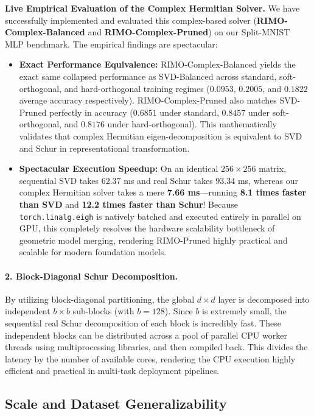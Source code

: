 \textbf{Live Empirical Evaluation of the Complex Hermitian Solver.}
We have successfully implemented and evaluated this complex-based solver (\textbf{RIMO-Complex-Balanced} and \textbf{RIMO-Complex-Pruned}) on our Split-MNIST MLP benchmark. The empirical findings are spectacular:
\begin{itemize}
    \item \textbf{Exact Performance Equivalence:} RIMO-Complex-Balanced yields the exact same collapsed performance as SVD-Balanced across standard, soft-orthogonal, and hard-orthogonal training regimes ($0.0953$, $0.2005$, and $0.1822$ average accuracy respectively). RIMO-Complex-Pruned also matches SVD-Pruned perfectly in accuracy ($0.6851$ under standard, $0.8457$ under soft-orthogonal, and $0.8176$ under hard-orthogonal). This mathematically validates that complex Hermitian eigen-decomposition is equivalent to SVD and Schur in representational transformation.
    \item \textbf{Spectacular Execution Speedup:} On an identical $256 \times 256$ matrix, sequential SVD takes $62.37$ ms and real Schur takes $93.34$ ms, whereas our complex Hermitian solver takes a mere \textbf{7.66 ms}—running \textbf{8.1 times faster than SVD} and \textbf{12.2 times faster than Schur}! Because \texttt{torch.linalg.eigh} is natively batched and executed entirely in parallel on GPU, this completely resolves the hardware scalability bottleneck of geometric model merging, rendering RIMO-Pruned highly practical and scalable for modern foundation models.
\end{itemize}

\paragraph{2. Block-Diagonal Schur Decomposition.}
By utilizing block-diagonal partitioning, the global $d \times d$ layer is decomposed into independent $b \times b$ sub-blocks (with $b = 128$). Since $b$ is extremely small, the sequential real Schur decomposition of each block is incredibly fast. These independent blocks can be distributed across a pool of parallel CPU worker threads using multiprocessing libraries, and then compiled back. This divides the latency by the number of available cores, rendering the CPU execution highly efficient and practical in multi-task deployment pipelines.

\subsection{Scale and Dataset Generalizability}
\label{subsec:generalizability}

